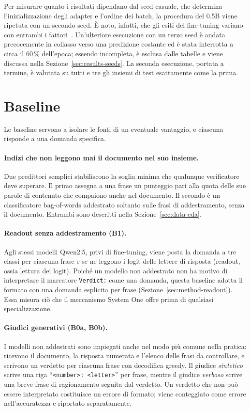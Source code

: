 Per misurare quanto i risultati dipendano dal seed casuale, che determina l'inizializzazione degli adapter e l'ordine dei
batch, la procedura del 0.5B viene ripetuta con un secondo seed. È noto, infatti, che gli esiti del fine-tuning variano
con entrambi i fattori~\cite{dodge2020finetuning}. Un'ulteriore esecuzione con un terzo seed è andata precocemente in
collasso verso una predizione costante ed è stata interrotta a circa il 60\,\% dell'epoca; essendo incompleta, è esclusa
dalle tabelle e viene discussa nella Sezione~\ref{sec:results-seeds}. La seconda esecuzione, portata a termine, è valutata
su tutti e tre gli insiemi di test esattamente come la prima.

\section{Baseline}
\label{sec:setup-baselines}

Le baseline servono a isolare le fonti di un eventuale vantaggio, e ciascuna risponde a una domanda specifica.

\paragraph{Indizi che non leggono mai il documento nel suo insieme.} Due predittori semplici stabiliscono la soglia
minima che qualunque verificatore deve superare. Il primo assegna a una frase un punteggio pari alla quota delle sue
parole di contenuto che compaiono anche nel documento. Il secondo è un classificatore bag-of-words addestrato soltanto
sulle frasi di addestramento, senza il documento. Entrambi sono descritti nella Sezione~\ref{sec:data-eda}.

\paragraph{Readout senza addestramento (B1).} Agli stessi modelli Qwen2.5, privi di fine-tuning, viene posta la domanda a
tre classi per ciascuna frase e se ne leggono i logit delle lettere di risposta (readout, ossia lettura dei logit).
Poiché un modello non addestrato non ha motivo di interpretare il marcatore \texttt{Verdict:} come una domanda, questa
baseline adotta il formato con una domanda esplicita per frase (Sezione~\ref{sec:method-readout}). Essa misura ciò che il
meccanismo System One offre prima di qualsiasi specializzazione.

\paragraph{Giudici generativi (B0a, B0b).} I modelli non addestrati sono impiegati anche nel modo più comune nella
pratica: ricevono il documento, la risposta numerata e l'elenco delle frasi da controllare, e scrivono un verdetto per
ciascuna frase con decodifica greedy. Il giudice \emph{sintetico} scrive una riga ``\texttt{<number>: <letter>}'' per
frase, mentre il giudice \emph{verboso} scrive una breve frase di ragionamento seguita dal verdetto. Un verdetto che non
può essere interpretato costituisce un errore di formato; viene conteggiato come errore nell'accuratezza e riportato
separatamente.


